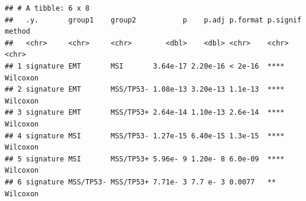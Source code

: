 \documentclass[
  12pt,
]{book}
\newenvironment{Shaded}{\begin{snugshade}}{\end{snugshade}}
\newcommand{\AttributeTok}[1]{\textcolor[rgb]{0.13,0.29,0.53}{#1}}
\newcommand{\ConstantTok}[1]{\textcolor[rgb]{0.56,0.35,0.01}{#1}}
\newcommand{\DecValTok}[1]{\textcolor[rgb]{0.00,0.00,0.81}{#1}}
\newcommand{\FunctionTok}[1]{\textcolor[rgb]{0.13,0.29,0.53}{\textbf{#1}}}
\newcommand{\NormalTok}[1]{#1}
\newcommand{\OtherTok}[1]{\textcolor[rgb]{0.56,0.35,0.01}{#1}}
\newcommand{\SpecialCharTok}[1]{\textcolor[rgb]{0.81,0.36,0.00}{\textbf{#1}}}
\newcommand{\StringTok}[1]{\textcolor[rgb]{0.31,0.60,0.02}{#1}}
\begin{document}
\begin{Shaded}
\end{Shaded}

\begin{verbatim}
## # A tibble: 6 x 8
##   .y.       group1    group2           p    p.adj p.format p.signif method  
##   <chr>     <chr>     <chr>        <dbl>    <dbl> <chr>    <chr>    <chr>   
## 1 signature EMT       MSI       3.64e-17 2.20e-16 < 2e-16  ****     Wilcoxon
## 2 signature EMT       MSS/TP53- 1.08e-13 3.20e-13 1.1e-13  ****     Wilcoxon
## 3 signature EMT       MSS/TP53+ 2.64e-14 1.10e-13 2.6e-14  ****     Wilcoxon
## 4 signature MSI       MSS/TP53- 1.27e-15 6.40e-15 1.3e-15  ****     Wilcoxon
## 5 signature MSI       MSS/TP53+ 5.96e- 9 1.20e- 8 6.0e-09  ****     Wilcoxon
## 6 signature MSS/TP53- MSS/TP53+ 7.71e- 3 7.7 e- 3 0.0077   **       Wilcoxon
\end{verbatim}

\begin{Shaded}
\end{Shaded}
\end{document}
